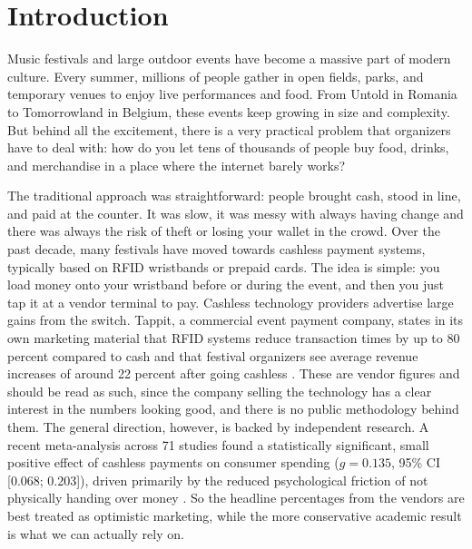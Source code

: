 \chapter{Introduction}
\label{chap:introduction}

Music festivals and large outdoor events have become a massive part of modern culture. Every summer, millions of people gather in open fields, parks, and temporary venues to enjoy live performances and food. From Untold in Romania to Tomorrowland in Belgium, these events keep growing in size and complexity. But behind all the excitement, there is a very practical problem that organizers have to deal with: how do you let tens of thousands of people buy food, drinks, and merchandise in a place where the internet barely works?

The traditional approach was straightforward: people brought cash, stood in line, and paid at the counter. It was slow, it was messy with always having change and there was always the risk of theft or losing your wallet in the crowd. Over the past decade, many festivals have moved towards cashless payment systems, typically based on RFID wristbands or prepaid cards. The idea is simple: you load money onto your wristband before or during the event, and then you just tap it at a vendor terminal to pay. Cashless technology providers advertise large gains from the switch. Tappit, a commercial event payment company, states in its own marketing material that RFID systems reduce transaction times by up to 80 percent compared to cash and that festival organizers see average revenue increases of around 22 percent after going cashless \cite{Tappit2024}. These are vendor figures and should be read as such, since the company selling the technology has a clear interest in the numbers looking good, and there is no public methodology behind them. The general direction, however, is backed by independent research. A recent meta-analysis across 71 studies found a statistically significant, small positive effect of cashless payments on consumer spending ($g = 0.135$, 95\% CI [0.068; 0.203]), driven primarily by the reduced psychological friction of not physically handing over money \cite{Schomburgk2024}. So the headline percentages from the vendors are best treated as optimistic marketing, while the more conservative academic result is what we can actually rely on.

